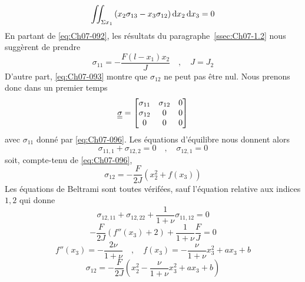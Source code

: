 \begin{equation}
    \iint_{\Sigma x_1} \left( x_2\sigma_{13} - x_3 \sigma_{12} \right) \mathop{\mathrm{{}d}}\mathopen{} x_2 \mathop{\mathrm{{}d}}\mathopen{} x_3 = 0
    \label{eq:Ch07-095}
\end{equation}
En partant de \eqref{eq:Ch07-092}, les résultats du paragraphe~\ref{ssec:Ch07-1.2} nous suggèrent de prendre
\begin{equation}
    \sigma_{11} = - \frac{F\left( l - x_1 \right)x_2}{J} \quad,\quad J = J_2
    \label{eq:Ch07-096}
\end{equation}
D'autre part, \eqref{eq:Ch07-093} montre que $\sigma_{12}$ ne peut pas être nul.
Nous prenons donc dans un premier temps
\begin{equation}
    \underline{\underline{\sigma}} = 
    \begin{bmatrix}
        \sigma_{11} & \sigma_{12} & 0 \\
        \sigma_{12} & 0 & 0 \\
        0 & 0 & 0
    \end{bmatrix}
    \label{eq:Ch07-097}
\end{equation}
avec $\sigma_{11}$ donné par \eqref{eq:Ch07-096}.
Les équations d'équilibre nous donnent alors
\begin{displaymath}
    \sigma_{11,1} + \sigma_{12,2} = 0 \quad,\quad \sigma_{12,1} = 0
\end{displaymath}
soit, compte-tenu de \eqref{eq:Ch07-096}, 
\begin{equation}
    \sigma_{12} = -\frac{F}{2J} ( x_2^2 + f(x_3) )
    \label{eq:Ch07-098}
\end{equation}
Les équations de Beltrami sont toutes vérifées, sauf l'équation relative aux indices $1,2$ qui donne 
\begin{displaymath}
    \sigma_{12,11}+\sigma_{12,22} + \frac{1}{1+\nu} \sigma_{11,12} = 0 
\end{displaymath}
\begin{displaymath}
    -\frac{F}{2J} \left( f''(x_3) + 2 \right) + \frac{1}{1+\nu} \frac{F}{J} = 0
\end{displaymath}
\begin{displaymath}
    f''(x_3)= -\frac{2\nu}{1+\nu} \quad,\quad f(x_3) = - \frac{\nu}{1+\nu} x_3^2 + a x_3 + b
\end{displaymath}
\begin{equation}
    \sigma_{12} = - \frac{F}{2J} \left( x_2^2 - \frac{\nu}{1+\nu} x_3^2 + ax_3 +b\right)
    \label{eq:Ch07-099}
\end{equation}

